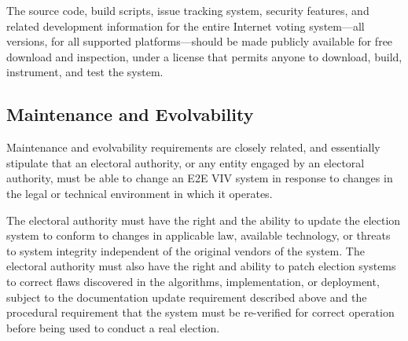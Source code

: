 The source code, build scripts, issue tracking system, security
features, and related development information for the entire Internet
voting system---all versions, for all supported platforms---should be
made publicly available for free download and inspection, under a
license that permits anyone to download, build, instrument, and test
the system.

\subsection{Maintenance and Evolvability}

Maintenance and evolvability requirements are closely related, and
essentially stipulate that an electoral authority, or any entity
engaged by an electoral authority, must be able to change an E2E VIV
system in response to changes in the legal or technical environment in
which it operates. 

The electoral authority must have the right and the ability to update
the election system to conform to changes in applicable law, available
technology, or threats to system integrity independent of the original
vendors of the system. The electoral authority must also have the
right and ability to patch election systems to correct flaws
discovered in the algorithms, implementation, or deployment, subject
to the documentation update requirement described above and the
procedural requirement that the system must be re-verified for correct
operation before being used to conduct a real election.
